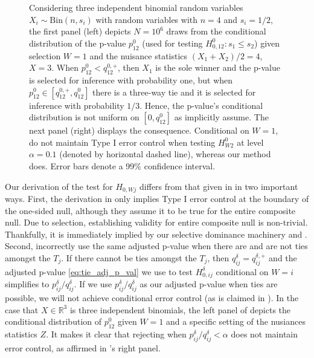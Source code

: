 \documentclass{article}
\newcommand{\R}{\mathbb{R}}
\begin{document}
\begin{figure}[]
    \caption{Considering three independent binomial random variables $X_i \sim \text{Bin}(n, s_i)$ with random variables with $n=4$ and $s_i = 1/2$, the first panel (left) depicts $N=10^6$ draws from the conditional distribution of the p-value $p^{0}_{12}$ (used for testing $H^{0}_{0, 12}: s_1 \leq s_2$) given selection $W= 1$ and the nuisance statistics $(X_1 + X_2)/2 = 4$, $X=3$. When $p_{12}^0  < q^{0, +}_{12}$, then $X_1$ is the sole winner and the p-value is selected for inference with probability one, but when $p_{12}^0 \in [q^{0, +}_{12}, q^0_{12}]$ there is a three-way tie and it is selected for inference with probability $1/3$. Hence, the p-value's conditional distribution is not uniform on $[0, q^0_{12}]$ as \cite{Hung2019} implicitly assume. The next panel (right) displays the consequence. Conditional on $W=1$, \cite{Hung2019} do not maintain Type I error control when testing $H^{0}_{W2}$ at level $\alpha=0.1$ (denoted by horizontal dashed line), whereas our method does. Error bars denote a 99\% confidence interval.}
    \label{fig:error_control}
\end{figure}

Our derivation of the test for $H_{0, Wj}$ differs from that given in \cite{Hung2019} in two important ways. First, the derivation in \cite{Hung2019} only implies Type I error control at the boundary of the one-sided null, although they assume it to be true for the entire composite null. Due to selection, establishing validity for entire composite null is non-trivial. Thankfully, it is immediately implied by our selective dominance machinery and . Second, \cite{Hung2019} incorrectly use the same adjusted p-value when there are and are not ties amongst the $T_j$. If there cannot be ties amongst the $T_j$, then $q^{\delta}_{ij} = q^{\delta, +}_{ij}$ and the adjusted p-value \eqref{eq:tie_adj_p_val} we use to test $H^{\delta}_{0, ij}$ conditional on $W = i$ simplifies to $p^{\delta}_{ij}/q^{\delta}_{ij}$. If we use $p^{\delta}_{ij}/q^{\delta}_{ij}$ as our adjusted p-value when ties are possible, we will not achieve conditional error control (as is claimed in \cite{Fithian2017}). In the case that $X \in \R^3$ is three independent binomials, the left panel of  depicts the conditional distribution of $p^{0}_{12}$ given $W=1$ and a specific setting of the nusiances statistics $Z$. It makes it clear that rejecting when $p^{\delta}_{ij}/q^{\delta}_{ij} < \alpha $ does not maintain error control, as affirmed in 's right panel. 
\end{document}
